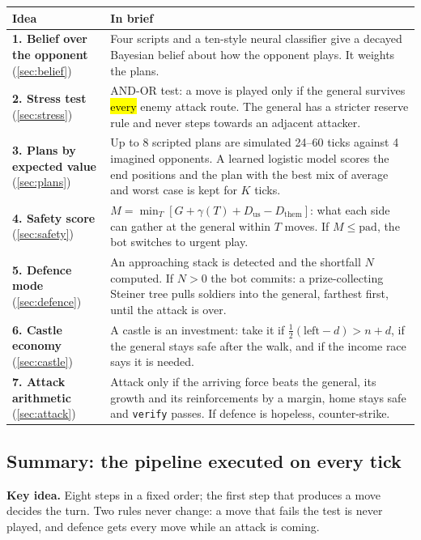 \begin{center}
\small
\begin{tabularx}{\linewidth}{>{\raggedright}p{3.2cm}X}
\toprule
\textbf{Idea} & \textbf{In brief}\\
\midrule
\textbf{1. Belief over the opponent} (\ref{sec:belief}) & Four scripts and a ten-style neural classifier give a decayed Bayesian belief about how the opponent plays. It weights the plans.\\
\textbf{2. Stress test} (\ref{sec:stress}) & AND-OR test: a move is played only if the general survives \hl{every} enemy attack route. The general has a stricter reserve rule and never steps towards an adjacent attacker.\\
\textbf{3. Plans by expected value} (\ref{sec:plans}) & Up to 8 scripted plans are simulated 24--60 ticks against 4 imagined opponents. A learned logistic model scores the end positions and the plan with the best mix of average and worst case is kept for $K$ ticks.\\
\textbf{4. Safety score} (\ref{sec:safety}) & $M=\min_T[G+\gamma(T)+D_{\text{us}}-D_{\text{them}}]$: what each side can gather at the general within $T$ moves. If $M\le\text{pad}$, the bot switches to urgent play.\\
\textbf{5. Defence mode} (\ref{sec:defence}) & An approaching stack is detected and the shortfall $N$ computed. If $N>0$ the bot commits: a prize-collecting Steiner tree pulls soldiers into the general, farthest first, until the attack is over.\\
\textbf{6. Castle economy} (\ref{sec:castle}) & A castle is an investment: take it if $\tfrac12(\text{left}-d)>n+d$, if the general stays safe after the walk, and if the income race says it is needed.\\
\textbf{7. Attack arithmetic} (\ref{sec:attack}) & Attack only if the arriving force beats the general, its growth and its reinforcements by a margin, home stays safe and \texttt{verify} passes. If defence is hopeless, counter-strike.\\
\bottomrule
\end{tabularx}
\end{center}

\subsection{Summary: the pipeline executed on every tick}\label{sec:pipeline}

\begin{keyidea}
\textbf{Key idea.} Eight steps in a fixed order; the first step that produces a move decides the turn. Two rules
never change: a move that fails the test is never played, and defence gets every move while an attack is
coming.
\end{keyidea}

